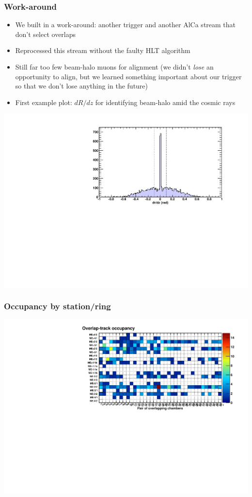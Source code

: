 \documentclass[compress]{beamer}
\begin{document}
\begin{frame}
\frametitle{Work-around}

\scriptsize
\begin{itemize}
\item We built in a work-around: another trigger and another AlCa stream that don't select overlaps
\item Reprocessed this stream without the faulty HLT algorithm
\item Still far too few beam-halo muons for alignment (we didn't {\it
  lose} an opportunity to align, but we learned something important
  about our trigger so that we don't lose anything in the future)
\item First example plot: $dR/dz$ for identifying beam-halo amid the cosmic rays
\end{itemize}

\includegraphics[width=0.8\linewidth]{correctedinput_drdz.pdf}
\end{frame}

\begin{frame}
\frametitle{Occupancy by station/ring}

\includegraphics[width=\linewidth]{correctedinput_occupancy.pdf}
\end{frame}
\end{document}
